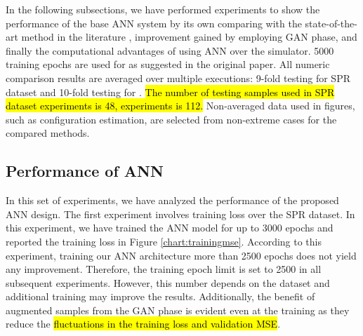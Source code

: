 \documentclass[journal]{IEEEtran}
\begin{document}
In the following subsections, we have performed experiments to show the performance of the base ANN system by its own comparing with the state-of-the-art method in the literature \cite{paper0}, improvement gained by employing GAN phase, and finally the computational advantages of using ANN over the simulator. 5000 training epochs are used for  \cite{paper0} as suggested in the original paper. All numeric comparison results are averaged over multiple executions: 9-fold testing for SPR dataset and 10-fold testing for \dszero. \hl{The number of testing samples used in SPR dataset experiments is 48, \dszero{} experiments is 112.} Non-averaged data used in figures, such as configuration estimation, are selected from non-extreme cases for the compared methods.
%
%

\subsection{Performance of ANN}

In this set of experiments, we have analyzed the performance of the proposed ANN design. The first experiment involves training loss over the SPR dataset. In this experiment, we have trained the ANN model for up to 3000 epochs and reported the training loss in Figure \ref{chart:trainingmse}. According to this experiment, training our ANN architecture more than 2500 epochs does not yield any improvement. Therefore, the training epoch limit is set to 2500 in all subsequent experiments. However, this number depends on the dataset and additional training may improve the results. Additionally, the benefit of augmented samples from the GAN phase is evident even at the training as they reduce the \hl{fluctuations in the training loss and validation MSE}.
\end{document}
